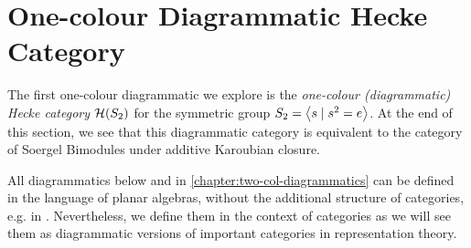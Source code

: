 \section{One-colour Diagrammatic Hecke Category}
\label{sec:3.1}

The first one-colour diagrammatic we explore is the \textit{one-colour (diagrammatic) Hecke category} $\mathcal{H}(S_2)$ for the symmetric group $S_2 = {\left\langle s \mathrel{|} s^2 = e \right\rangle}$. At the end of this section, we see that this diagrammatic category is equivalent to the category of Soergel Bimodules under additive Karoubian closure.

\begin{remark}
    All diagrammatics below and in \autoref{chapter:two-col-diagrammatics} can be defined in the language of planar algebras, without the additional structure of categories, e.g. in \cite{jones-planar-algebra}. Nevertheless, we define them in the context of categories as we will see them as diagrammatic versions of important categories in representation theory.
\end{remark}

